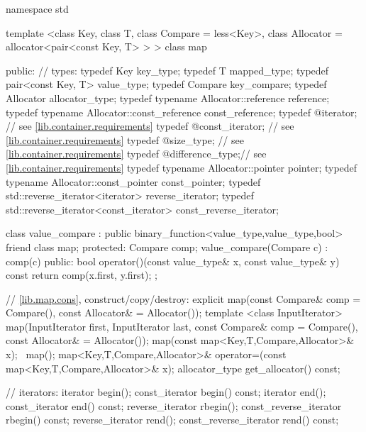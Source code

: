 \begin{codeblock}
namespace std {
  template <class Key, class T, class Compare = less<Key>,
            class Allocator = allocator<pair<const Key, T> > >
  class map {
  public:
    // types:
    typedef Key                                   key_type;
    typedef T                                     mapped_type;
    typedef pair<const Key, T>                    value_type;
    typedef Compare                               key_compare;
    typedef Allocator                             allocator_type;
    typedef typename Allocator::reference         reference;
    typedef typename Allocator::const_reference   const_reference;
    typedef @\impdef@                iterator;       // see \ref{lib.container.requirements}
    typedef @\impdef@                const_iterator; // see \ref{lib.container.requirements}
    typedef @\impdef@                size_type;      // see \ref{lib.container.requirements}
    typedef @\impdef@                difference_type;// see \ref{lib.container.requirements}
    typedef typename Allocator::pointer           pointer;
    typedef typename Allocator::const_pointer     const_pointer;
    typedef std::reverse_iterator<iterator>       reverse_iterator;
    typedef std::reverse_iterator<const_iterator> const_reverse_iterator;

    class value_compare
      : public binary_function<value_type,value_type,bool> {
    friend class map;
    protected:
      Compare comp;
      value_compare(Compare c) : comp(c) {}
    public:
      bool operator()(const value_type& x, const value_type& y) const {
        return comp(x.first, y.first);
      }
    };

    // \ref{lib.map.cons}, construct/copy/destroy:
    explicit map(const Compare& comp = Compare(),
                 const Allocator& = Allocator());
    template <class InputIterator>
      map(InputIterator first, InputIterator last,
          const Compare& comp = Compare(), const Allocator& = Allocator());
    map(const map<Key,T,Compare,Allocator>& x);
   ~map();
    map<Key,T,Compare,Allocator>&
      operator=(const map<Key,T,Compare,Allocator>& x);
    allocator_type get_allocator() const;

    // iterators:
    iterator               begin();
    const_iterator         begin() const;
    iterator               end();
    const_iterator         end() const;
    reverse_iterator       rbegin();
    const_reverse_iterator rbegin() const;
    reverse_iterator       rend();
    const_reverse_iterator rend() const;

}}
\end{codeblock}
